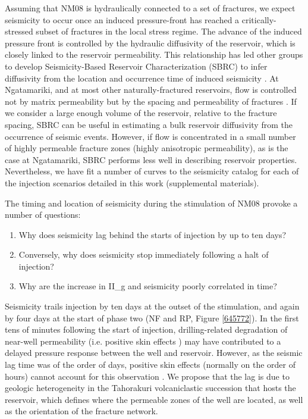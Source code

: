 Assuming that NM08 is hydraulically connected to a set of fractures, we expect seismicity to occur once an induced pressure-front has reached a critically-stressed subset of fractures in the local stress regime. The advance of the induced pressure front is controlled by the hydraulic \gls{diffusivity} of the reservoir, which is closely linked to the reservoir \gls{permeability}. This relationship has led other groups to develop Seismicity-Based Reservoir Characterization (SBRC) to infer \gls{diffusivity} from the location and occurrence time of induced seismicity \citep[e.g.][]{Shapiro_2002,Shapiro_2009,Parotidis_2004,Jeanne_2015deformation}. At Ngatamariki, and at most other naturally-fractured reservoirs, flow is controlled not by matrix \gls{permeability} but by the spacing and \gls{permeability} of fractures \citep{Grant_2011}. If we consider a large enough volume of the reservoir, relative to the fracture spacing, SBRC can be useful in estimating a bulk reservoir \gls{diffusivity} from the occurrence of seismic events. However, if flow is concentrated in a small number of highly permeable fracture zones (highly anisotropic \gls{permeability}), as is the case at Ngatamariki, SBRC performs less well in describing reservoir properties. Nevertheless, we have fit a number of curves to the seismicity catalog for each of the injection scenarios detailed in this work (supplemental materials).

The timing and location of seismicity during the \gls{stimulation} of NM08 provoke a number of questions:
\begin{enumerate}
    \item Why does seismicity lag behind the starts of injection by up to ten days?
    \item Conversely, why does seismicity stop immediately following a halt of injection?
    \item Why are the increase in \gls{II_g} and seismicity poorly correlated in time?
\end{enumerate}

Seismicity trails injection by ten days at the outset of the \gls{stimulation}, and again by four days at the start of phase two (NF and RP, Figure \ref{645772}). In the first tens of minutes following the start of injection, drilling-related degradation of near-well \gls{permeability} (i.e. positive skin effects \citep{Grant_2011}) may have contributed to a delayed pressure response between the well and reservoir. However, as the seismic lag time was of the order of days, positive skin effects (normally on the order of hours) cannot account for this observation \citep{horne1995modern}. We propose that the lag is due to geologic heterogeneity in the Tahorakuri volcaniclastic succession that hosts the reservoir, which defines where the permeable zones of the well are located, as well as the orientation of the fracture network.

